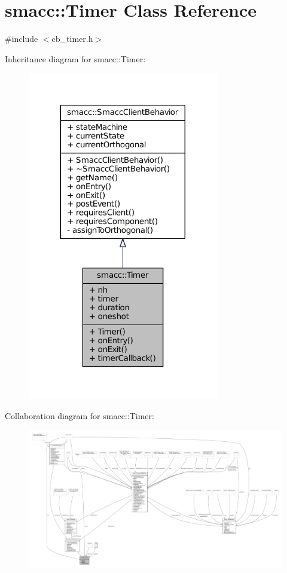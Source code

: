 \hypertarget{classsmacc_1_1Timer}{}\section{smacc\+:\+:Timer Class Reference}
\label{classsmacc_1_1Timer}


{\ttfamily \#include $<$cb\+\_\+timer.\+h$>$}



Inheritance diagram for smacc\+:\+:Timer\+:
\nopagebreak
\begin{figure}[H]
\begin{center}
\leavevmode
\includegraphics[width=236pt]{classsmacc_1_1Timer__inherit__graph}
\end{center}
\end{figure}


Collaboration diagram for smacc\+:\+:Timer\+:
\nopagebreak
\begin{figure}[H]
\begin{center}
\leavevmode
\includegraphics[width=350pt]{classsmacc_1_1Timer__coll__graph}
\end{center}
\end{figure}
